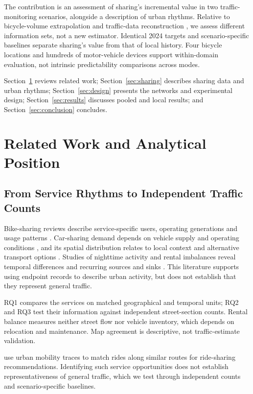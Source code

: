 \documentclass[]{interact}
\begin{document}
The contribution is an assessment of sharing's incremental value in two traffic-monitoring scenarios, alongside a description of urban rhythms. Relative to bicycle-volume extrapolation \citep{kaiser2025} and traffic-data reconstruction \citep{cini2022,lei2022}, we assess different information sets, not a new estimator. Identical 2024 targets and scenario-specific baselines separate sharing's value from that of local history. Four bicycle locations and hundreds of motor-vehicle devices support within-domain evaluation, not intrinsic predictability comparisons across modes.

Section~\ref{sec:related} reviews related work; Section~\ref{sec:sharing} describes sharing data and urban rhythms; Section~\ref{sec:design} presents the networks and experimental design; Section~\ref{sec:results} discusses pooled and local results; and Section~\ref{sec:conclusion} concludes.

\section{Related Work and Analytical Position}
\label{sec:related}
\subsection{From Service Rhythms to Independent Traffic Counts}
Bike-sharing reviews describe service-specific users, operating generations and usage patterns \citep{shaheen2010,fishman2016}. Car-sharing demand depends on vehicle supply and operating conditions \citep{jorge2013}, and its spatial distribution relates to local context and alternative transport options \citep{becker2017}. Studies of nighttime activity and rental imbalances reveal temporal differences and recurring sources and sinks \citep{yu2024,song2026}. This literature supports using endpoint records to describe urban activity, but does not establish that they represent general traffic.

RQ1 compares the services on matched geographical and temporal units; RQ2 and RQ3 test their information against independent street-section counts. Rental balance measures neither street flow nor vehicle inventory, which depends on relocation and maintenance. Map agreement is descriptive, not traffic-estimate validation.

\citet{bicocchi2017rides} use urban mobility traces to match rides along similar routes for ride-sharing recommendations. Identifying such service opportunities does not establish representativeness of general traffic, which we test through independent counts and scenario-specific baselines.
\end{document}
